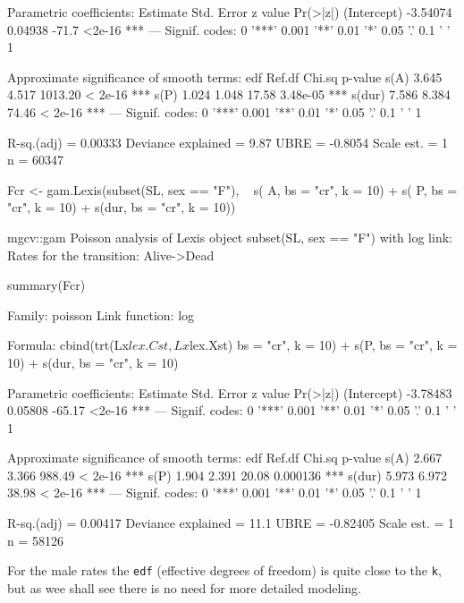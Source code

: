\begin{enumerate}[resume]
\begin{Schunk}
\begin{Soutput}
Parametric coefficients:
            Estimate Std. Error z value Pr(>|z|)    
(Intercept) -3.54074    0.04938   -71.7   <2e-16 ***
---
Signif. codes:  0 '***' 0.001 '**' 0.01 '*' 0.05 '.' 0.1 ' ' 1

Approximate significance of smooth terms:
         edf Ref.df  Chi.sq  p-value    
s(A)   3.645  4.517 1013.20  < 2e-16 ***
s(P)   1.024  1.048   17.58 3.48e-05 ***
s(dur) 7.586  8.384   74.46  < 2e-16 ***
---
Signif. codes:  0 '***' 0.001 '**' 0.01 '*' 0.05 '.' 0.1 ' ' 1

R-sq.(adj) =  0.00333   Deviance explained = 9.87%
UBRE = -0.8054  Scale est. = 1         n = 60347
\end{Soutput}
\begin{Sinput}
 Fcr <- gam.Lexis(subset(SL, sex == "F"),
                  ~ s(  A, bs = "cr", k = 10) +
                    s(  P, bs = "cr", k = 10) +
                    s(dur, bs = "cr", k = 10))
\end{Sinput}
\begin{Soutput}
mgcv::gam Poisson analysis of Lexis object subset(SL, sex == "F") with log link:
Rates for the transition:
Alive->Dead
\end{Soutput}
\begin{Sinput}
 summary(Fcr)
\end{Sinput}
\begin{Soutput}
Family: poisson 
Link function: log 

Formula:
cbind(trt(Lx$lex.Cst, Lx$lex.Xst) %in% trnam, Lx$lex.dur) ~ s(A, 
    bs = "cr", k = 10) + s(P, bs = "cr", k = 10) + s(dur, bs = "cr", 
    k = 10)

Parametric coefficients:
            Estimate Std. Error z value Pr(>|z|)    
(Intercept) -3.78483    0.05808  -65.17   <2e-16 ***
---
Signif. codes:  0 '***' 0.001 '**' 0.01 '*' 0.05 '.' 0.1 ' ' 1

Approximate significance of smooth terms:
         edf Ref.df Chi.sq  p-value    
s(A)   2.667  3.366 988.49  < 2e-16 ***
s(P)   1.904  2.391  20.08 0.000136 ***
s(dur) 5.973  6.972  38.98  < 2e-16 ***
---
Signif. codes:  0 '***' 0.001 '**' 0.01 '*' 0.05 '.' 0.1 ' ' 1

R-sq.(adj) =  0.00417   Deviance explained = 11.1%
UBRE = -0.82405  Scale est. = 1         n = 58126
\end{Soutput}
\end{Schunk}
For the male rates the \texttt{edf} (effective degrees of freedom) is
quite close to the \texttt{k}, but as wee shall see there is no need
for more detailed modeling.


\end{enumerate}
